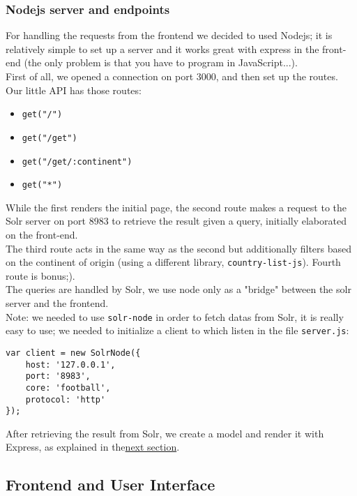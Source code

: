\documentclass{article}
\begin{document}
\subsubsection{Nodejs server and endpoints}
For handling the requests from the frontend we decided to used Nodejs; it is relatively simple to set up a server and it works great with express in the front-end (the only problem is that you have to program in JavaScript...).\\
First of all, we opened a connection on port 3000, and then set up the routes.\\
Our little API has those routes:
\begin{itemize}
    \item \texttt{get("/")}
    \item \texttt{get("/get")}
    \item \texttt{get("/get/:continent")}
    \item \texttt{get("*")}
\end{itemize}
While the first renders the initial page, the second route makes a request to the Solr server on port 8983 to retrieve the result given a query, initially elaborated on the front-end.\\The third route acts in the same way as the second but additionally filters based on the continent of origin (using a different library, \texttt{country-list-js}). Fourth route is bonus;).\\
The queries are handled by Solr, we use node only as a "bridge" between the solr server and the frontend.\\
Note: we needed to use \texttt{solr-node} in order to fetch datas from Solr, it is really easy to use; we needed to initialize a client to which listen in the file \texttt{server.js}:\\
\begin{lstlisting}[caption={Snippet of code in \texttt{server.js} to set up connection with Solr server}, captionpos=b]
var client = new SolrNode({
    host: '127.0.0.1',
    port: '8983',
    core: 'football',
    protocol: 'http'
});
\end{lstlisting}
After retrieving the result from Solr, we create a model and render it with Express, as explained in the\hyperref[sec:frontend]{next section}.

\subsection{Frontend and User Interface}
\label{sec:frontend}
\end{document}

